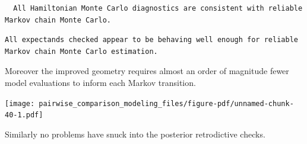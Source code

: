 \documentclass[
  letterpaper,
  DIV=11,
  numbers=noendperiod]{scrartcl}
\newenvironment{Shaded}{\begin{snugshade}}{\end{snugshade}}
\newcommand{\AttributeTok}[1]{\textcolor[rgb]{0.40,0.45,0.13}{#1}}
\newcommand{\ConstantTok}[1]{\textcolor[rgb]{0.56,0.35,0.01}{#1}}
\newcommand{\DecValTok}[1]{\textcolor[rgb]{0.68,0.00,0.00}{#1}}
\newcommand{\FunctionTok}[1]{\textcolor[rgb]{0.28,0.35,0.67}{#1}}
\newcommand{\NormalTok}[1]{\textcolor[rgb]{0.00,0.23,0.31}{#1}}
\newcommand{\OtherTok}[1]{\textcolor[rgb]{0.00,0.23,0.31}{#1}}
\newcommand{\SpecialCharTok}[1]{\textcolor[rgb]{0.37,0.37,0.37}{#1}}
\newcommand{\StringTok}[1]{\textcolor[rgb]{0.13,0.47,0.30}{#1}}
\begin{document}
\begin{verbatim}
  All Hamiltonian Monte Carlo diagnostics are consistent with reliable
Markov chain Monte Carlo.
\end{verbatim}

\begin{Shaded}
\end{Shaded}

\begin{verbatim}
All expectands checked appear to be behaving well enough for reliable
Markov chain Monte Carlo estimation.
\end{verbatim}

Moreover the improved geometry requires almost an order of magnitude
fewer model evaluations to inform each Markov transition.

\begin{Shaded}
\end{Shaded}

\texttt{[image: pairwise\_comparison\_modeling\_files/figure-pdf/unnamed-chunk-40-1.pdf]}

Similarly no problems have snuck into the posterior retrodictive checks.
\end{document}
